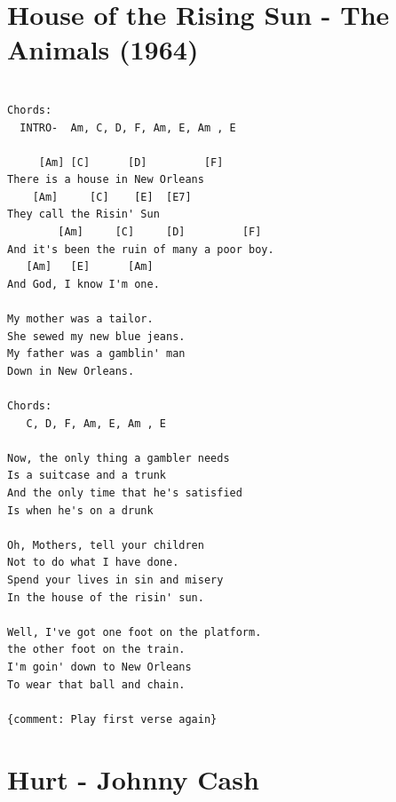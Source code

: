 \documentclass[
]{book}
\let\stdsection\section
\renewcommand\section{\clearpage\stdsection}
\begin{document}
\hypertarget{house-of-the-rising-sun---the-animals-1964}{%
\section{House of the Rising Sun - The Animals (1964)}\label{house-of-the-rising-sun---the-animals-1964}}

\begin{verbatim}

Chords:
  INTRO-  Am, C, D, F, Am, E, Am , E 

     [Am] [C]      [D]         [F]
There is a house in New Orleans
    [Am]     [C]    [E]  [E7]
They call the Risin' Sun
        [Am]     [C]     [D]         [F]
And it's been the ruin of many a poor boy.
   [Am]   [E]      [Am]
And God, I know I'm one.

My mother was a tailor.
She sewed my new blue jeans.
My father was a gamblin' man
Down in New Orleans.

Chords:
   C, D, F, Am, E, Am , E 

Now, the only thing a gambler needs
Is a suitcase and a trunk
And the only time that he's satisfied
Is when he's on a drunk

Oh, Mothers, tell your children
Not to do what I have done.
Spend your lives in sin and misery
In the house of the risin' sun.

Well, I've got one foot on the platform.
the other foot on the train.
I'm goin' down to New Orleans
To wear that ball and chain.

{comment: Play first verse again}

\end{verbatim}

\hypertarget{hurt---johnny-cash}{%
\section{Hurt - Johnny Cash}\label{hurt---johnny-cash}}
\end{document}
